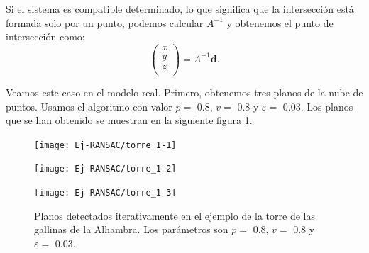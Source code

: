 Si el sistema es compatible determinado, lo que significa que la intersección está formada solo por un punto, podemos calcular $ A^{-1} $ y obtenemos el punto de intersección como:
\[
\begin{pmatrix}
x\\
y\\
z\\
\end{pmatrix} = A^{-1}\mathbf{d}.
\]

Veamos este caso en el modelo real. Primero, obtenemos tres planos de la nube de puntos. Usamos el algoritmo con valor $ p =$ 0.8, $ v =$ 0.8 y $ \varepsilon =$ 0.03. Los planos que se han obtenido se muestran en la siguiente figura \ref{fig:RNASACptoInter}. \\
\begin{figure}[h!]
	\begin{minipage}{0.5\textwidth}
		\centering
		\texttt{[image: Ej-RANSAC/torre\_1-1]} 
	\end{minipage}
	\begin{minipage}{0.5\textwidth}
		\centering
		\texttt{[image: Ej-RANSAC/torre\_1-2]} 
	\end{minipage}
	\begin{center}
		\begin{minipage}{0.5\textwidth}
		\centering
		\texttt{[image: Ej-RANSAC/torre\_1-3]} 
	\end{minipage}
	\end{center}
	\caption{Planos detectados iterativamente en el ejemplo de la torre de las gallinas de la Alhambra. Los parámetros son $ p =$ 0.8, $ v =$ 0.8 y $ \varepsilon =$ 0.03.}
	\label{fig:RNASACptoInter}
\end{figure}

